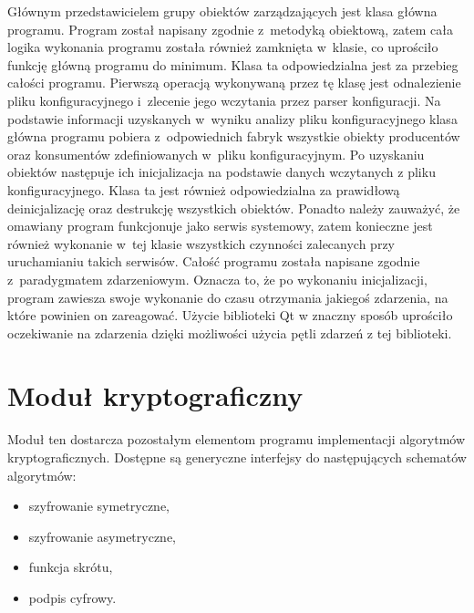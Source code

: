 Głównym przedstawicielem grupy obiektów zarządzających jest klasa
główna programu. Program został napisany zgodnie z~metodyką obiektową,
zatem cała logika wykonania programu została również zamknięta
w~klasie, co uprościło funkcję główną programu do minimum. Klasa ta
odpowiedzialna jest za przebieg całości programu. Pierwszą operacją
wykonywaną przez tę klasę jest odnalezienie pliku konfiguracyjnego
i~zlecenie jego wczytania przez parser konfiguracji. Na podstawie
informacji uzyskanych w~wyniku analizy pliku konfiguracyjnego klasa
główna programu pobiera z~odpowiednich fabryk wszystkie obiekty
producentów oraz konsumentów zdefiniowanych w~pliku
konfiguracyjnym. Po uzyskaniu obiektów następuje ich inicjalizacja na
podstawie danych wczytanych z pliku konfiguracyjnego. Klasa ta jest
również odpowiedzialna za prawidłową deinicjalizację oraz destrukcję
wszystkich obiektów. Ponadto należy zauważyć, że omawiany program
funkcjonuje jako serwis systemowy, zatem konieczne jest również
wykonanie w~tej klasie wszystkich czynności zalecanych przy
uruchamianiu takich serwisów. Całość programu została napisane zgodnie
z~paradygmatem zdarzeniowym. Oznacza to, że po wykonaniu inicjalizacji,
program zawiesza swoje wykonanie do czasu otrzymania jakiegoś
zdarzenia, na które powinien on zareagować. Użycie biblioteki Qt w
znaczny sposób uprościło oczekiwanie na zdarzenia dzięki możliwości
użycia pętli zdarzeń z tej biblioteki.

\section[Moduł kryptograficzny][Moduł kryptograficzny]{Moduł kryptograficzny}

Moduł ten dostarcza pozostałym elementom programu implementacji
algorytmów kryptograficznych. Dostępne są generyczne interfejsy do
następujących schematów algorytmów:

\begin{itemize}
\item szyfrowanie symetryczne,
\item szyfrowanie asymetryczne,
\item funkcja skrótu,
\item podpis cyfrowy.
\end{itemize}

